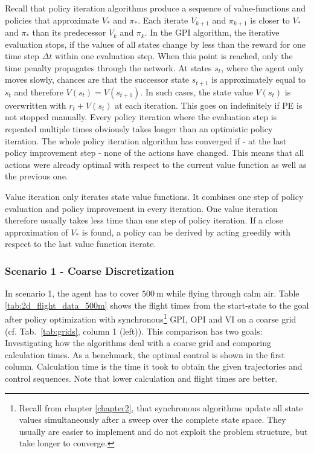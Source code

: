 Recall that policy iteration algorithms produce a sequence of value-functions and policies that approximate $V_*$ and $\pi_*$. Each iterate $V_{k+1}$ and $\pi_{k+1}$ is closer to $V_*$ and $\pi_*$ than its predecessor $V_k$ and $\pi_k$.
In the GPI algorithm, the iterative evaluation stops, if the values of all states change by less than the reward for one time step $\Delta t$ within one evaluation step. When this point is reached, only the time penalty propagates through the network. At states $s_t$, where the agent only moves slowly, chances are that the successor state $s_{t+1}$ is approximately equal to $s_t$ and therefore $V(s_t)=V(s_{t+1})$. In such cases, the state value $V(s_t)$ is overwritten with $r_t + V(s_t)$ at each iteration. This goes on indefinitely if PE is not stopped manually. Every policy iteration where the evaluation step is repeated multiple times obviously takes longer than an optimistic policy iteration. The whole policy iteration algorithm has converged if - at the last policy improvement step - none of the actions have changed. This means that all actions were already optimal with respect to the current value function as well as the previous one. \smallbreak

Value iteration only iterates state value functions. It combines one step of policy evaluation and policy improvement in every iteration. One value iteration therefore usually takes less time than one step of policy iteration. If a close approximation of $V_*$ is found, a policy can be derived by acting greedily with respect to the last value function iterate.

\subsubsection{Scenario 1 - Coarse Discretization}

In scenario 1, the agent has to cover $500~\text{m}$ while flying through calm air. Table \ref{tab:2d_flight_data_500m} shows the flight times from the start-state to the goal after policy optimization with synchronous\footnote{Recall from chapter \ref{chapter2}, that synchronous algorithms update all state values simultaneously after a sweep over the complete state space. They usually are easier to implement and do not exploit the problem structure, but take longer to converge.} GPI, OPI and VI on a coarse grid (cf. Tab.~\ref{tab:grids}, column 1 (left)). This comparison has two goals: Investigating how the algorithms deal with a coarse grid and comparing calculation times. As a benchmark, the optimal control  is shown in the first column. Calculation time is the time it took to obtain the given trajectories and control sequences. Note that lower calculation and flight times are better.

